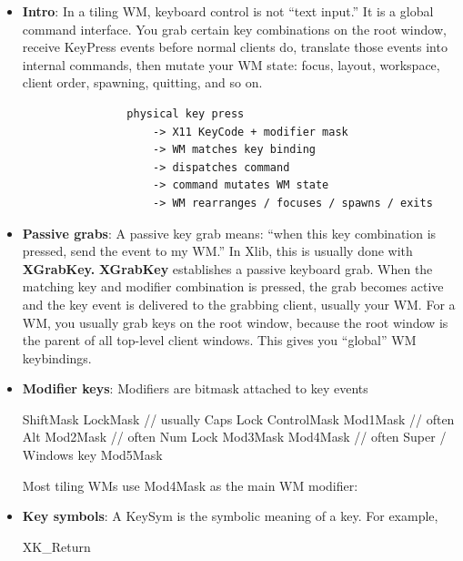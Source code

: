 \documentclass{report}
\begin{document}
    \pagebreak 
    \begin{itemize}
        \item \textbf{Intro}: In a tiling WM, keyboard control is not “text input.” It is a global command interface. You grab certain key combinations on the root window, receive KeyPress events before normal clients do, translate those events into internal commands, then mutate your WM state: focus, layout, workspace, client order, spawning, quitting, and so on.
            \begin{verbatim}
                physical key press
                    -> X11 KeyCode + modifier mask
                    -> WM matches key binding
                    -> dispatches command
                    -> command mutates WM state
                    -> WM rearranges / focuses / spawns / exits
            \end{verbatim}
        \item \textbf{Passive grabs}: A passive key grab means: “when this key combination is pressed, send the event to my WM.”
            \bigbreak \noindent 
            In Xlib, this is usually done with \textbf{XGrabKey.}
            \bigbreak \noindent 
            \textbf{XGrabKey} establishes a passive keyboard grab. When the matching key and modifier combination is pressed, the grab becomes active and the key event is delivered to the grabbing client, usually your WM.
            \bigbreak \noindent 
            For a WM, you usually grab keys on the root window, because the root window is the parent of all top-level client windows. This gives you “global” WM keybindings.
        \item \textbf{Modifier keys}: Modifiers are bitmask attached to key events
            \bigbreak \noindent
            \begin{cppcode}
                ShiftMask
                LockMask       // usually Caps Lock
                ControlMask
                Mod1Mask       // often Alt
                Mod2Mask       // often Num Lock
                Mod3Mask
                Mod4Mask       // often Super / Windows key
                Mod5Mask
            \end{cppcode}
            \bigbreak \noindent 
            Most tiling WMs use Mod4Mask as the main WM modifier:
        \item \textbf{Key symbols}: A KeySym is the symbolic meaning of a key. For example,
            \bigbreak \noindent 
            \begin{cppcode}
                XK_Return

\end{cppcode}
\end{itemize}
\end{document}
